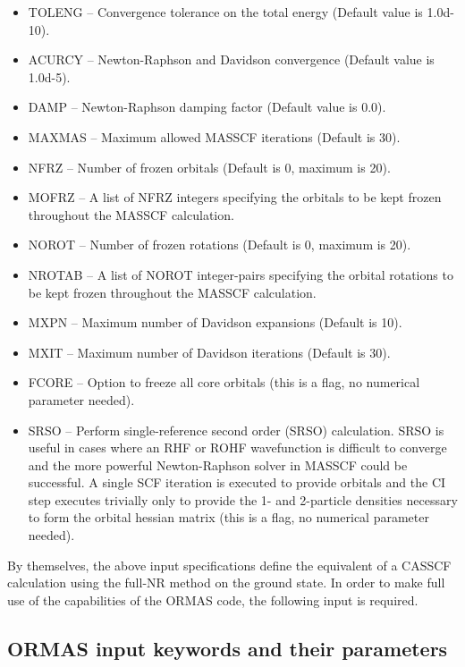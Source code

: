 \documentclass[11pt,fleqn]{article}
\begin{document}
\begin{itemize}
\item  TOLENG -- Convergence tolerance on the total energy 
(Default value is 1.0d-10).
\item  ACURCY -- Newton-Raphson and Davidson convergence
(Default value is 1.0d-5).
\item  DAMP   -- Newton-Raphson damping factor (Default value is 0.0).
\item  MAXMAS -- Maximum allowed MASSCF iterations (Default is 30).
\item  NFRZ   -- Number of frozen orbitals (Default is 0, maximum is 20).
\item  MOFRZ  -- A list of NFRZ integers specifying the orbitals to be 
kept frozen throughout the MASSCF calculation.
\item  NOROT  -- Number of frozen rotations (Default is 0, maximum is 20).
\item  NROTAB -- A list of NOROT integer-pairs specifying the orbital 
rotations to be kept frozen throughout the MASSCF calculation.
\item  MXPN   -- Maximum number of Davidson expansions (Default is 10).
\item  MXIT   -- Maximum number of Davidson iterations (Default is 30).
\item  FCORE  -- Option to freeze all core orbitals 
(this is a flag, no numerical parameter needed). 
\item  SRSO   -- Perform single-reference second order (SRSO) calculation. 
SRSO is useful in cases where an RHF or ROHF wavefunction is difficult to 
converge and the more powerful Newton-Raphson solver in MASSCF could be 
successful. A single SCF iteration is executed to provide orbitals and the 
CI step executes trivially only to provide the 1- and 2-particle densities 
necessary to form the orbital hessian matrix
(this is a flag, no numerical parameter needed). 
\end{itemize}

By themselves, the above input specifications define the equivalent of 
a CASSCF calculation using the full-NR method on the ground state. 
In order to make full use of the capabilities of the ORMAS code, 
the following input is required.\\

\subsection[ORMAS input keywords and their parameters]{ORMAS input keywords and their parameters}
\end{document}
